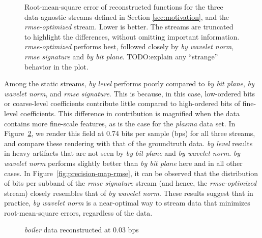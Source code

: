 \begin{figure}[h]
  \centering
  \caption{Root-mean-square error of reconstructed functions for the three data-agnostic streams
  defined in Section \ref{sec:motivation}, and the \emph{rmse-optimized} stream. Lower is better.
  The streams are truncated to highlight the differences, without omitting important information.
  \emph{rmse-optimized} performs best, followed closely by \emph{by wavelet norm}, \emph{rmse
  signature} and \emph{by bit plane}. TODO:explain any ``strange'' behavior in the plot.}
 	\label{fig:rmse-optimized}
\end{figure}

Among the static streams, \emph{by level} performs poorly compared to \emph{by bit plane}, \emph{by
wavelet norm}, and \emph{rmse signature}. This is because, in this case, low-ordered bits or
coarse-level coefficients contribute little compared to high-ordered bits of fine-level
coefficients. This difference in contribution is magnified when the data contains more fine-scale
features, as is the case for the \emph{plasma} data set. In Figure~\ref{fig:rmse-rendering}, we
render this field at 0.74 bits per sample (bps) for all three streams, and compare these rendering
with that of the groundtruth data. \emph{by level} results in heavy artifacts that are not seen by
\emph{by bit plane} and \emph{by wavelet norm}. \emph{by wavelet norm} performs slightly better than
\emph{by bit plane} here and in all other cases. In Figure~\ref{fig:precision-map-rmse}, it can be
observed that the distribution of bits per subband of the \emph{rmse signature} stream (and hence,
the \emph{rmse-optimized} stream) closely resembles that of \emph{by wavelet norm}. These results
suggest that in practice, \emph{by wavelet norm} is a near-optimal way to stream data that minimizes
root-mean-square errors, regardless of the data.

\begin{figure}[h]
	\centering
	\caption{\emph{boiler} data reconstructed at 0.03 bps}
 	\label{fig:rmse-rendering}
\end{figure}
